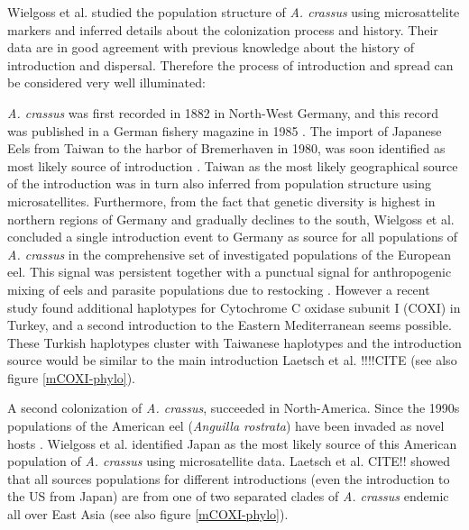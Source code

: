 Wielgoss et al. \cite{wielgoss_population_2008} studied the population
structure of \textit{A. crassus} using microsattelite markers and
inferred details about the colonization process and history. Their
data are in good agreement with previous knowledge about the history
of introduction and dispersal. Therefore the process of introduction
and spread can be considered very well illuminated:


\textit{A. crassus} was first recorded in 1882 in North-West Germany,
and this record was published in a German fishery magazine in 1985
\cite{fischer_teichwirt}. The import of Japanese Eels from Taiwan to
the harbor of Bremerhaven in 1980, was soon identified as most likely
source of introduction
\cite{koops_anguillicola-infestations_1989}. Taiwan as the most likely
geographical source of the introduction was in turn also inferred from
population structure using microsatellites. Furthermore, from the fact
that genetic diversity is highest in northern regions of Germany and
gradually declines to the south, Wielgoss et al.  concluded a single
introduction event to Germany as source for all populations of
\textit{A. crassus} in the comprehensive set of investigated
populations of the European eel. This signal was persistent together
with a punctual signal for anthropogenic mixing of eels and parasite
populations due to restocking \cite{pmid20646147}. However a recent
study found additional haplotypes for Cytochrome C oxidase subunit I
(COXI) in Turkey, and a second introduction to the Eastern
Mediterranean seems possible. These Turkish haplotypes cluster with
Taiwanese haplotypes and the introduction source would be similar to
the main introduction Laetsch et al. !!!!CITE (see also figure
\ref{mCOXI-phylo}).

A second colonization of \textit{A. crassus}, succeeded in
North-America. Since the 1990s populations of the American eel
(\textit{Anguilla rostrata}) have been invaded as novel hosts
\cite{fries_notes:_1996,barse_exotic_1999,
  barse_swimbladder_2001}. Wielgoss et al. identified Japan as the
most likely source of this American population of \textit{A. crassus}
using microsatellite data. Laetsch et al. CITE!! showed that all
sources populations for different introductions (even the introduction
to the US from Japan) are from one of two separated clades of
\textit{A. crassus} endemic all over East Asia (see also figure
\ref{mCOXI-phylo}).

